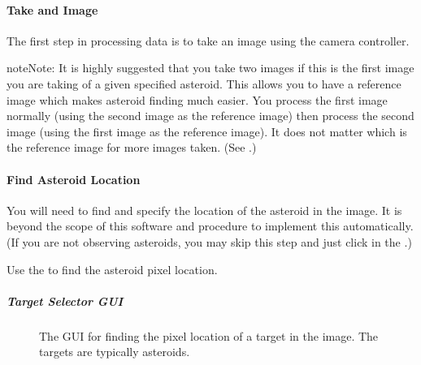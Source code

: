 \documentclass[letterpaper,11pt,english]{sphinxmanual}
\begin{document}
\paragraph{Take and Image}
\label{\detokenize{user/manual_mode:take-and-image}}
\sphinxAtStartPar
The first step in processing data is to take an image using the camera
controller.

\begin{sphinxadmonition}{note}{Note:}
\sphinxAtStartPar
It is highly suggested that you take two images if this is the first image
you are taking of a given specified asteroid. This allows you to have a
reference image which makes asteroid finding much easier. You process the
first image normally (using the second image as the reference image) then
process the second image (using the first image as the reference image).
It does not matter which is the reference image for more images taken. (See
{\hyperref[\detokenize{user/manual_mode:user-manual-mode-procedure-find-asteroid-location}]{}}.)
\end{sphinxadmonition}


\paragraph{Find Asteroid Location}
\label{\detokenize{user/manual_mode:find-asteroid-location}}\label{\detokenize{user/manual_mode:user-manual-mode-procedure-find-asteroid-location}}
\sphinxAtStartPar
You will need to find and specify the location of the asteroid in the image.
It is beyond the scope of this software and procedure to implement this
automatically. (If you are not observing asteroids, you may skip this step
and just click  in the
{\hyperref[\detokenize{user/manual_mode:user-manual-mode-procedure-find-asteroid-location-target-selector-gui}]{}}.)

\sphinxAtStartPar
Use the {\hyperref[\detokenize{user/manual_mode:user-manual-mode-procedure-find-asteroid-location-target-selector-gui}]{}}
to find the asteroid pixel location.


\subparagraph{Target Selector GUI}
\label{\detokenize{user/manual_mode:target-selector-gui}}\label{\detokenize{user/manual_mode:user-manual-mode-procedure-find-asteroid-location-target-selector-gui}}
\begin{figure}[H]
\centering
\capstart

\noindent{}
\caption{The GUI for finding the pixel location of a target in the image. The
targets are typically asteroids.}\label{\detokenize{user/manual_mode:id4}}\label{\detokenize{user/manual_mode:figure-target-selector-gui}}\end{figure}
\end{document}
